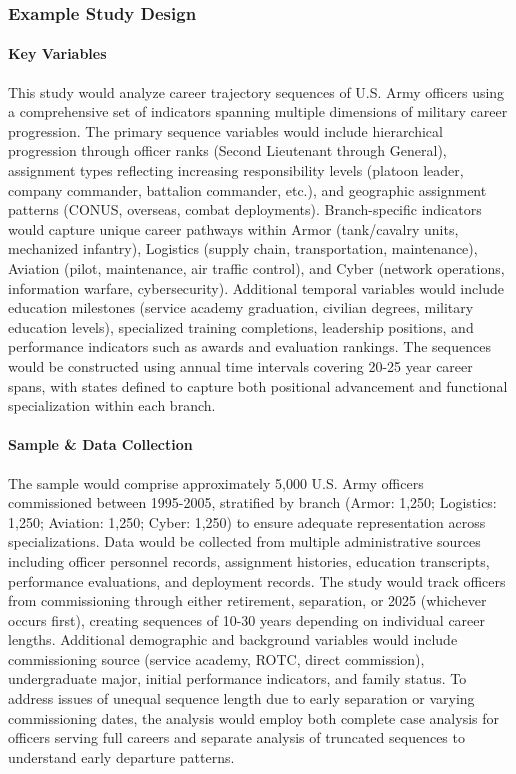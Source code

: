 \documentclass[./main.tex]{subfiles}
\begin{document}
\subsubsection{Example Study Design}\label{example-study-design}

\paragraph{Key Variables}\label{key-variables}

This study would analyze career trajectory sequences of U.S. Army
officers using a comprehensive set of indicators spanning multiple
dimensions of military career progression. The primary sequence
variables would include hierarchical progression through officer ranks
(Second Lieutenant through General), assignment types reflecting
increasing responsibility levels (platoon leader, company commander,
battalion commander, etc.), and geographic assignment patterns (CONUS,
overseas, combat deployments). Branch-specific indicators would capture
unique career pathways within Armor (tank/cavalry units, mechanized
infantry), Logistics (supply chain, transportation, maintenance),
Aviation (pilot, maintenance, air traffic control), and Cyber (network
operations, information warfare, cybersecurity). Additional temporal
variables would include education milestones (service academy
graduation, civilian degrees, military education levels), specialized
training completions, leadership positions, and performance indicators
such as awards and evaluation rankings. The sequences would be
constructed using annual time intervals covering 20-25 year career
spans, with states defined to capture both positional advancement and
functional specialization within each branch.

\paragraph{Sample \& Data Collection}\label{sample-data-collection}

The sample would comprise approximately 5,000 U.S. Army officers
commissioned between 1995-2005, stratified by branch (Armor: 1,250;
Logistics: 1,250; Aviation: 1,250; Cyber: 1,250) to ensure adequate
representation across specializations. Data would be collected from
multiple administrative sources including officer personnel records,
assignment histories, education transcripts, performance evaluations,
and deployment records. The study would track officers from
commissioning through either retirement, separation, or 2025 (whichever
occurs first), creating sequences of 10-30 years depending on individual
career lengths. Additional demographic and background variables would
include commissioning source (service academy, ROTC, direct commission),
undergraduate major, initial performance indicators, and family status.
To address issues of unequal sequence length due to early separation or
varying commissioning dates, the analysis would employ both complete
case analysis for officers serving full careers and separate analysis of
truncated sequences to understand early departure patterns.
\end{document}
